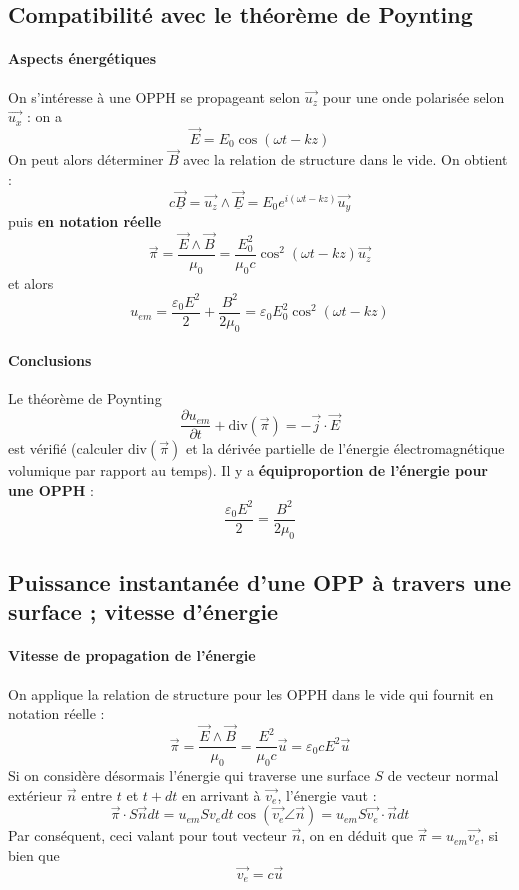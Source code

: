 \documentclass[french]{book}
\theoremstyle{plain}
\theoremstyle{definition}
\theoremstyle{remark}
\renewcommand{\div}{\text{div}}
\begin{document}
\subsection{Compatibilité avec le théorème de Poynting}
\paragraph{Aspects énergétiques} On s'intéresse à une OPPH se propageant selon $\overrightarrow{u_z}$ pour une onde polarisée selon $\overrightarrow{u_x}$ : on a $$\overrightarrow{E}=E_0\cos\left(\omega t-kz\right)$$ On peut alors déterminer $\overrightarrow{B}$ avec la relation de structure dans le vide. On obtient : $$c\overrightarrow{\underline{B}}=\overrightarrow{u_z}\wedge\overrightarrow{\underline{E}}=E_0e^{i(\omega t-kz)}\overrightarrow{u_y}$$ puis \textbf{en notation réelle} $$\overrightarrow{\pi}=\frac{\overrightarrow{E}\wedge\overrightarrow{B}}{\mu_0}=\frac{E_0^2}{\mu_0 c}\cos^2(\omega t-kz)\overrightarrow{u_z}$$ et alors $$u_{em}=\frac{\varepsilon_0E^2}{2}+\frac{B^2}{2\mu_0}=\varepsilon_0 E_0^2\cos^2(\omega t-kz)$$  
\paragraph{Conclusions} Le théorème de Poynting $$\frac{\partial u_{em}}{\partial t}+\div(\overrightarrow{\pi})=-\overrightarrow{j}\cdot\overrightarrow{E}$$est vérifié (calculer $\div(\overrightarrow{\pi})$ et la dérivée partielle de l'énergie électromagnétique volumique par rapport au temps). Il y a \textbf{équiproportion de l'énergie pour une OPPH} : $$\frac{\varepsilon_0 E^2}{2}=\frac{B^2}{2\mu_0}$$
\subsection{Puissance instantanée d'une OPP à travers une surface ; vitesse d'énergie}
\paragraph{Vitesse de propagation de l’énergie} On applique la relation de structure pour les OPPH dans le vide qui fournit en notation réelle : $$\overrightarrow{\pi}=\frac{\overrightarrow{E}\wedge\overrightarrow{B}}{\mu_0}=\frac{E^2}{\mu_0c}\overrightarrow{u}=\varepsilon_0cE^2\overrightarrow{u}$$ Si on considère désormais l'énergie qui traverse une surface $S$ de vecteur normal extérieur $\overrightarrow{n}$ entre $t$ et $t+dt$ en arrivant à $\overrightarrow{v_e}$, l'énergie vaut : $$\overrightarrow{\pi}\cdot S\overrightarrow{n}dt=u_{em}Sv_edt\cos(\overrightarrow{v_e}\angle\overrightarrow{n})=u_{em}S\overrightarrow{v_e}\cdot\overrightarrow{n}dt$$ Par conséquent, ceci valant pour tout vecteur $\overrightarrow{n}$, on en déduit que $\overrightarrow{\pi}=u_{em}\overrightarrow{v_e}$, si bien que $$\overrightarrow{v_e}=c\overrightarrow{u}$$
\end{document}
